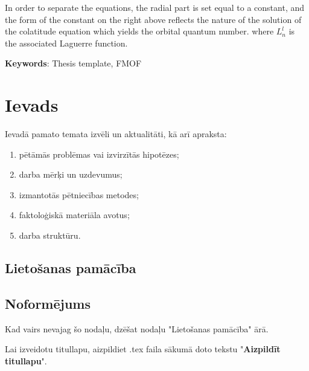 \documentclass[12pt]{report}%
\theoremstyle{definition}
\begin{document}
\noindent In order to separate the equations, the radial part is set equal to a constant, and the form of the constant on the right above reflects the nature of the solution of the colatitude equation which yields the orbital quantum number. where $L_n^l$ is the associated Laguerre function.

\vspace{4mm}
\noindent \textbf{Keywords}: Thesis template, FMOF

\newpage
\tableofcontents
\newpage


\printnomenclature



\chapter*{Ievads}
Ievadā pamato temata izvēli un aktualitāti, kā arī apraksta:

\begin{enumerate}
    \item pētāmās problēmas vai izvirzītās hipotēzes;
    \item darba mērķi un uzdevumus;
    \item izmantotās pētniecības metodes;
    \item faktoloģiskā materiāla avotus;
    \item darba struktūru.
\end{enumerate}



\begin{center}
    \chapter*{Lietošanas pamācība}
\end{center}
\section{Noformējums}
\noindent Kad vairs nevajag šo nodaļu, dzēšat nodaļu "Lietošanas pamācība" ārā.

Lai izveidotu titullapu, aizpildiet .tex faila sākumā doto tekstu "\textbf{Aizpildīt titullapu}".
\end{document}
